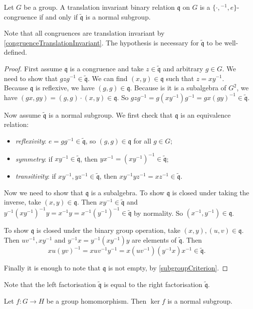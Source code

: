 \begin{proposition} \label{congruenceNormalSubgroup}
Let $G$ be a group.
A translation invariant binary relation $\mathfrak{q}$ on $G$ is a $\{\cdot, {}^{-1}, e\}$-congruence \textup{if and only if} $\widetilde{\mathfrak{q}}$ is a normal subgroup.
\end{proposition}
Note that all congruences are translation invariant by \ref{congruenceTranslationInvariant}. The hypothesis is necessary for $\widetilde{\mathfrak{q}}$ to be well-defined.
\begin{proof}
First assume $\mathfrak{q}$ is a congruence and take $z\in\widetilde{\mathfrak{q}}$ and arbitrary $g\in G$. We need to show that $gzg^{-1}\in \widetilde{\mathfrak{q}}$. We can find $(x,y)\in \mathfrak{q}$ such that $z = xy^{-1}$. Because $\mathfrak{q}$ is reflexive, we have $(g,g)\in\mathfrak{q}$. Because is it is a subalgebra of $G^2$, we have $(gx,gy) = (g,g)\cdot (x,y)\in \mathfrak{q}$. So $gzg^{-1} = g(xy^{-1})g^{-1} = gx(gy)^{-1} \in \widetilde{\mathfrak{q}}$.

Now assume $\widetilde{\mathfrak{q}}$ is a normal subgroup. We first check that $\mathfrak{q}$ is an equivalence relation:
\begin{itemize}
\item \emph{reflexivity}: $e = gg^{-1}\in \widetilde{\mathfrak{q}}$, so $(g,g)\in\mathfrak{q}$ for all $g\in G$;
\item \emph{symmetry}: if $xy^{-1}\in \widetilde{\mathfrak{q}}$, then $yx^{-1} = (xy^{-1})^{-1}\in \widetilde{\mathfrak{q}}$;
\item \emph{transitivity}: if $xy^{-1}, yz^{-1}\in \widetilde{\mathfrak{q}}$, then $xy^{-1}yz^{-1} = xz^{-1}\in \widetilde{\mathfrak{q}}$.
\end{itemize}
Now we need to show that $\mathfrak{q}$ is a subalgebra. To show $\mathfrak{q}$ is closed under taking the inverse, take $(x,y) \in \mathfrak{q}$. Then $xy^{-1}\in \widetilde{\mathfrak{q}}$ and $y^{-1}(xy^{-1})^{-1}y = x^{-1}y = x^{-1}(y^{-1})^{-1} \in \widetilde{\mathfrak{q}}$ by normality. So $(x^{-1}, y^{-1}) \in \mathfrak{q}$.

To show $\mathfrak{q}$ is closed under the binary group operation, take $(x,y),(u,v)\in\mathfrak{q}$. Then $uv^{-1}, xy^{-1}$ and $y^{-1}x = y^{-1}(xy^{-1})y$ are elements of $\widetilde{\mathfrak{q}}$. Then
\[ xu(yv)^{-1} = xuv^{-1}y^{-1} = x(uv^{-1})(y^{-1}x)x^{-1} \in \widetilde{\mathfrak{q}}. \]

Finally it is enough to note that $\mathfrak{q}$ is not empty, by \ref{subgroupCriterion}.
\end{proof}
Note that the left factorisation $\widetilde{\mathfrak{q}}$ is equal to the right factorisation $\widetilde{\mathfrak{q}}$.
\begin{corollary} \label{kernelNormalSubgroup}
Let $f: G\to H$ be a group homomorphism. Then $\ker f$ is a normal subgroup.
\end{corollary}

